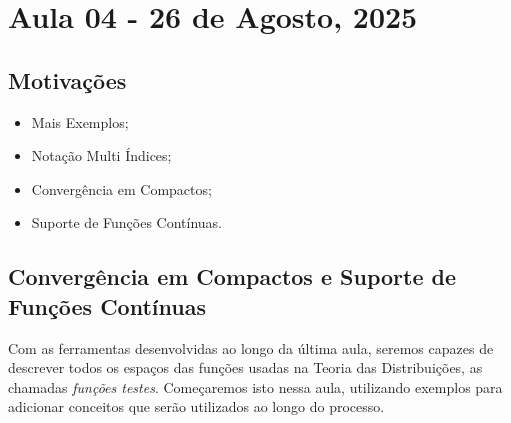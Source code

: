 \documentclass[../distribution_theory_notes.tex]{subfiles}
\begin{document}
\section{Aula 04 - 26 de Agosto, 2025}
\subsection{Motivações}
\begin{itemize}
	\item Mais Exemplos;
	\item Notação Multi Índices;
	\item Convergência em Compactos;
	\item Suporte de Funções Contínuas.
\end{itemize}
\subsection{Convergência em Compactos e Suporte de Funções Contínuas}
Com as ferramentas desenvolvidas ao longo da última aula, seremos capazes de descrever todos os espaços das funções usadas na Teoria das Distribuições, as chamadas \textit{funções testes}. Começaremos isto nessa aula, utilizando exemplos para adicionar conceitos que serão utilizados ao longo do processo.
\end{document}
